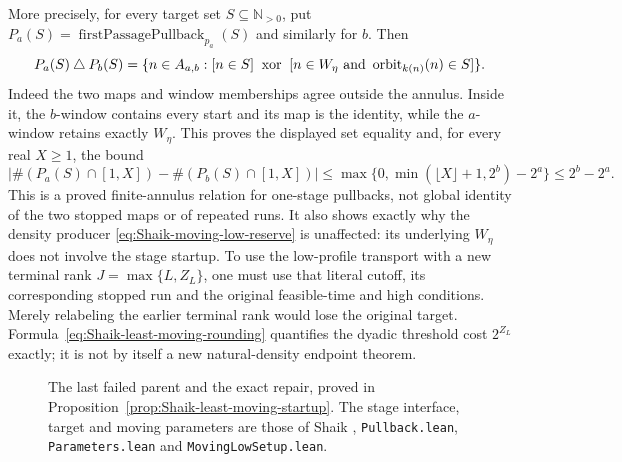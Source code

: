 More precisely, for every target set \(S\subseteq\mathbb N_{>0}\),
put \(P_a(S)=\operatorname{firstPassagePullback}_{p_a}(S)\)
and similarly for \(b\). Then
\begin{equation}\label{eq:Shaik-startup-pullback-difference}
 P_a(S)\mathbin{\triangle}P_b(S)
 =\{n\in A_{a,b}:
 [n\in S]\ \mathbin{\mathrm{xor}}\
 [n\in W_\eta\ \hbox{and}\ \operatorname{orbit}_{k(n)}(n)\in S]\}.
\end{equation}
Indeed the two maps and window memberships agree outside the
annulus. Inside it, the \(b\)-window contains every start and its
map is the identity, while the \(a\)-window retains exactly
\(W_\eta\). This proves the displayed set equality and, for every
real \(X\ge1\), the bound
\[
 \left|\#(P_a(S)\cap[1,X])-\#(P_b(S)\cap[1,X])\right|
 \le \max\{0,\min(\lfloor X\rfloor+1,2^b)-2^a\}
 \le 2^b-2^a.
\]
This is a proved finite-annulus relation for one-stage pullbacks,
not global identity of the two stopped maps or of repeated runs.
It also shows exactly why the density producer
\eqref{eq:Shaik-moving-low-reserve} is unaffected:
its underlying \(W_\eta\) does not involve the stage startup.
To use the low-profile transport with a new terminal rank
\(J=\max\{L,Z_L\}\), one must use that literal cutoff, its
corresponding stopped run and the original feasible-time and high
conditions. Merely relabeling the earlier terminal rank would
lose the original target. Formula~\eqref{eq:Shaik-least-moving-rounding}
quantifies the dyadic threshold cost \(2^{Z_L}\) exactly;
it is not by itself a new natural-density endpoint theorem.

\begin{figure}[ht]
\centering
{}
\caption{The last failed parent and the exact repair, proved in
Proposition~\ref{prop:Shaik-least-moving-startup}.
The stage interface, target and moving parameters are those of
Shaik \cite{Shaik2026v324}, \texttt{Pullback.lean},
\texttt{Parameters.lean} and \texttt{MovingLowSetup.lean}.}
\end{figure}

